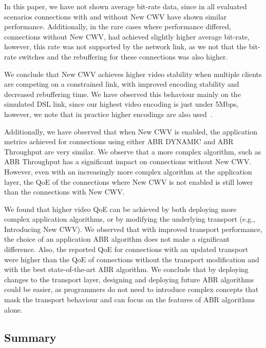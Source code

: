 \documentclass[10pt,sigconf]{acmart}
\begin{document}
In this paper, we have not shown average bit-rate data, since in all evaluated scenarios connections with and without New CWV have shown similar performance. Additionally, in the rare cases where performance differed, connections without New CWV, had achieved slightly higher average bit-rate, however, this rate was not supported by the network link, as we not that the bit-rate switches and the rebuffering for these connections was also higher.

We conclude that New CWV achieves higher video stability when multiple clients are competing on a constrained link, with improved encoding stability and decreased rebuffering time. We have observed this behaviour mainly on the simulated DSL link, since our highest video encoding is just under 5Mbps, however, we note that in practice higher encodings are also used~\cite{online-youtube-encodings}.

Additionally, we have observed that when New CWV is enabled, the application metrics achieved for connections using either ABR DYNAMIC and ABR Throughput are very similar. We observe that a more complex algorithm, such as ABR Throughput has a significant impact on connections without New CWV. However, even with an increasingly more complex algorithm at the application layer, the QoE of the connections where New CWV is not enabled is still lower than the connections with New CWV.

We found that higher video QoE can be achieved by both deploying more complex application algorithms, or by modifying the underlying transport (e.g., Introducing New CWV). We observed that with improved transport performance, the choice of an application ABR algorithm does not make a significant difference. Also, the reported QoE for connections with an updated transport were higher than the QoE of connections without the transport modification and with the best state-of-the-art ABR algorithm. We conclude that by deploying changes to the transport layer, designing and deploying future ABR algorithms could be easier, as programmers do not need to introduce complex concepts that mask the transport behaviour and can focus on the features of ABR algorithms alone.

\subsection{Summary}
\label{sec:summary}
\end{document}

